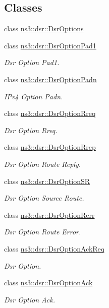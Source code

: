\subsection*{Classes}
\begin{DoxyCompactItemize}
\item 
class \hyperlink{classns3_1_1dsr_1_1DsrOptions}{ns3\+::dsr\+::\+Dsr\+Options}
\item 
class \hyperlink{classns3_1_1dsr_1_1DsrOptionPad1}{ns3\+::dsr\+::\+Dsr\+Option\+Pad1}
\begin{DoxyCompactList}\small\item\em Dsr Option Pad1. \end{DoxyCompactList}\item 
class \hyperlink{classns3_1_1dsr_1_1DsrOptionPadn}{ns3\+::dsr\+::\+Dsr\+Option\+Padn}
\begin{DoxyCompactList}\small\item\em I\+Pv4 Option Padn. \end{DoxyCompactList}\item 
class \hyperlink{classns3_1_1dsr_1_1DsrOptionRreq}{ns3\+::dsr\+::\+Dsr\+Option\+Rreq}
\begin{DoxyCompactList}\small\item\em Dsr Option Rreq. \end{DoxyCompactList}\item 
class \hyperlink{classns3_1_1dsr_1_1DsrOptionRrep}{ns3\+::dsr\+::\+Dsr\+Option\+Rrep}
\begin{DoxyCompactList}\small\item\em Dsr Option Route Reply. \end{DoxyCompactList}\item 
class \hyperlink{classns3_1_1dsr_1_1DsrOptionSR}{ns3\+::dsr\+::\+Dsr\+Option\+SR}
\begin{DoxyCompactList}\small\item\em Dsr Option Source Route. \end{DoxyCompactList}\item 
class \hyperlink{classns3_1_1dsr_1_1DsrOptionRerr}{ns3\+::dsr\+::\+Dsr\+Option\+Rerr}
\begin{DoxyCompactList}\small\item\em Dsr Option Route Error. \end{DoxyCompactList}\item 
class \hyperlink{classns3_1_1dsr_1_1DsrOptionAckReq}{ns3\+::dsr\+::\+Dsr\+Option\+Ack\+Req}
\begin{DoxyCompactList}\small\item\em Dsr Option. \end{DoxyCompactList}\item 
class \hyperlink{classns3_1_1dsr_1_1DsrOptionAck}{ns3\+::dsr\+::\+Dsr\+Option\+Ack}
\begin{DoxyCompactList}\small\item\em Dsr Option Ack. \end{DoxyCompactList}\end{DoxyCompactItemize}
